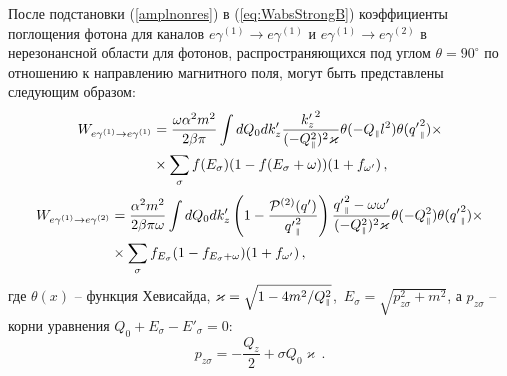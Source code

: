 После подстановки (\ref{amplnonres}) в
(\ref{eq:WabsStrongB}) коэффициенты поглощения фотона для каналов $e\gamma^{(1)}\to e\gamma^{(1)}$ и $e\gamma^{(1)}\to e\gamma^{(2)}$ в нерезонансной области для фотонов, распространяющихся под углом $\theta=90^\circ$ по отношению к направлению магнитного поля,  могут быть представлены следующим образом:
\begin{equation}\label{Wnonres}\begin{aligned}
		W_{e\gamma^{(1)}\to e\gamma^{(1)}}&=\frac{\omega \alpha^2m^2}{2 \beta \pi}\int dQ_0 dk_z' \frac{{k_z'}^2}{(-Q_{\mbox{\tiny $\|$}}^2)^2\varkappa}\theta(-Q_{\mbox{\tiny $\|$}}l^2)
		\theta( {q'}_{\mbox{\tiny $\|$}}^2)\times\\&\times \sum_{\sigma} f(E_\sigma)(1-f(E_\sigma+\omega))(1+f_{\omega'})\, ,
\end{aligned}\end{equation}
\begin{equation}
	\begin{aligned}\label{Wnonres2}
		W_{e\gamma^{(1)}\to e\gamma^{(2)}}&=\frac{ \alpha^2m^2}{2 \beta \pi \omega}\int dQ_0 dk_z'\left(1-\frac{{\cal P}^{(2)}(q')}{{q'}_{\mbox{\tiny $\|$}}^2}\right) \frac{{q'}_{\mbox{\tiny $\|$}}^2-\omega\omega'}{(-Q_{\mbox{\tiny $\|$}}^2)^2\varkappa}\theta(-Q_{\mbox{\tiny $\|$}}^2)
		\theta({q'}_{\mbox{\tiny $\|$}}^2)\times\\ &\times\sum_{\sigma} f_{E_\sigma}(1-f_{E_\sigma+\omega})(1+f_{\omega'})\, ,
	\end{aligned}
\end{equation}
\noindent где $\theta(x)$ -- функция Хевисайда,
\mbox{$\varkappa = \sqrt{1 - 4m^2/Q^2_{\mbox{\tiny $\|$}}}$, 
$E_\sigma=\sqrt{p_{z\sigma}^2+m^2}$}, а $p_{z\sigma}$ -- корни уравнения 
$Q_0+E_\sigma-E'_\sigma=0$:
\begin{equation}\label{savelaw}
	p_{z\sigma}=-\frac{Q_z}{2}+ \sigma Q_0 \varkappa\, .
\end{equation} 

